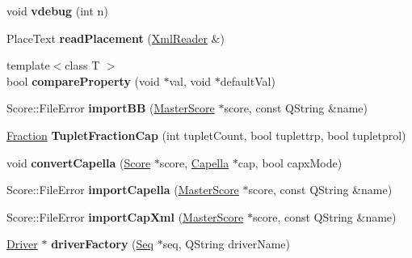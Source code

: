 \begin{DoxyCompactItemize}
void {\bfseries vdebug} (int n)
\item 
\mbox{\label{namespace_ms_ace3d1e06ca8d8c3bc351c1e226719e7f}} 
Place\+Text {\bfseries read\+Placement} (\hyperlink{class_ms_1_1_xml_reader}{Xml\+Reader} \&)
\item 
\mbox{\label{namespace_ms_a901fe177c3798a963830d5da06fd04e3}} 
{\footnotesize template$<$class T $>$ }\\bool {\bfseries compare\+Property} (void $\ast$val, void $\ast$default\+Val)
\item 
\mbox{\label{namespace_ms_a0ea6ee99ea7088ec3068fbddcee56a29}} 
Score\+::\+File\+Error {\bfseries import\+BB} (\hyperlink{class_ms_1_1_master_score}{Master\+Score} $\ast$score, const Q\+String \&name)
\item 
\mbox{\label{namespace_ms_a3158dc68175fd5a4028e4715a77bcba3}} 
\hyperlink{class_ms_1_1_fraction}{Fraction} {\bfseries Tuplet\+Fraction\+Cap} (int tuplet\+Count, bool tuplettrp, bool tupletprol)
\item 
\mbox{\label{namespace_ms_a357b05f2642d03c15a446667407a7436}} 
void {\bfseries convert\+Capella} (\hyperlink{class_ms_1_1_score}{Score} $\ast$score, \hyperlink{class_ms_1_1_capella}{Capella} $\ast$cap, bool capx\+Mode)
\item 
\mbox{\label{namespace_ms_af1c5be0e7369dc70fe25d22cd3c35a6b}} 
Score\+::\+File\+Error {\bfseries import\+Capella} (\hyperlink{class_ms_1_1_master_score}{Master\+Score} $\ast$score, const Q\+String \&name)
\item 
\mbox{\label{namespace_ms_a9279cd4bc462d2afc6780a9c35398743}} 
Score\+::\+File\+Error {\bfseries import\+Cap\+Xml} (\hyperlink{class_ms_1_1_master_score}{Master\+Score} $\ast$score, const Q\+String \&name)
\item 
\mbox{\label{namespace_ms_a2eb8b281dda3c7b9b3e0d17e1f93d639}} 
\hyperlink{class_ms_1_1_driver}{Driver} $\ast$ {\bfseries driver\+Factory} (\hyperlink{class_ms_1_1_seq}{Seq} $\ast$seq, Q\+String driver\+Name)
\item 
\mbox{\label{namespace_ms_ad2944b23a7131292b8ff341d5c023904}} 

\end{DoxyCompactItemize}
